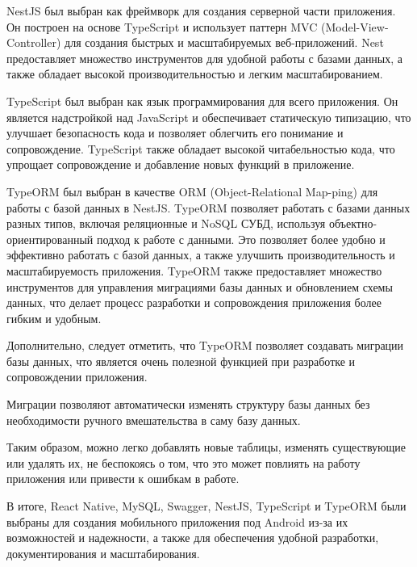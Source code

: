 NestJS \cite{NestJsGuide} был выбран как фреймворк для создания серверной части приложения.
Он построен на основе TypeScript и использует паттерн MVC (Model-View-Controller) для создания быстрых и масштабируемых веб-приложений.
Nest предоставляет множество инструментов для удобной работы с базами данных, а также обладает высокой производительностью и легким масштабированием.

TypeScript \cite{TypeScriptGuide} был выбран как язык программирования для всего приложения.
Он является надстройкой над JavaScript и обеспечивает статическую типизацию, что улучшает безопасность кода и позволяет облегчить его понимание и сопровождение.
TypeScript также обладает высокой читабельностью кода, что упрощает сопровождение и добавление новых функций в приложение.

TypeORM \cite{TypeORM} \cite{TypeOrmQueryRunner} был выбран в качестве ORM (Object-Relational Map-ping) для работы с базой данных в NestJS.
TypeORM позволяет работать с базами данных разных типов, включая реляционные и NoSQL СУБД, используя объектно-ориентированный подход к работе с данными.
Это позволяет более удобно и эффективно работать с базой данных, а также улучшить производительность и масштабируемость приложения.
TypeORM также предоставляет множество инструментов для управления миграциями базы данных и обновлением схемы данных, что делает процесс разработки и сопровождения приложения более гибким и удобным.

Дополнительно, следует отметить, что TypeORM позволяет создавать миграции базы данных,
что является очень полезной функцией при разработке и сопровождении приложения.

Миграции позволяют автоматически изменять структуру базы данных
без необходимости ручного вмешательства в саму базу данных.

Таким образом, можно легко добавлять новые таблицы,
изменять существующие или удалять их, не беспокоясь о том,
что это может повлиять на работу приложения или привести к ошибкам в работе.

В итоге, React Native, MySQL, Swagger, NestJS, TypeScript и TypeORM были выбраны для создания мобильного приложения под Android из-за их возможностей и надежности,
а также для обеспечения удобной разработки, документирования и масштабирования.

\newpage
